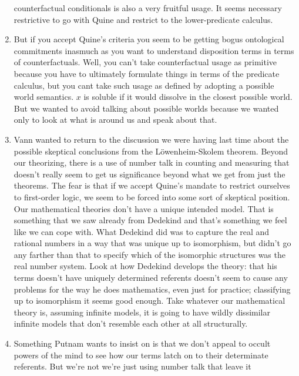 \documentclass[12pt]{article}
\theoremstyle{definition}
\begin{document}
\begin{enumerate}
        counterfactual conditionals is also a very fruitful usage. It seems
        necessary restrictive to go with Quine and restrict to the
        lower-predicate calculus.
    \item
        But if you accept Quine's criteria you seem to be getting bogus
        ontological commitments inasmuch as you want to understand disposition
        terms in terms of counterfactuals. Well, you can't take counterfactual
        usage as primitive because you have to ultimately formulate things in
        terms of the predicate calculus, but you cant take such usage as
        defined by adopting a possible world semantics. $x$ is soluble if it
        would dissolve in the closest possible world. But we wanted to avoid
        talking about possible worlds because we wanted only to look at what is
        around us and speak about that.
    \item
        Vann wanted to return to the discussion we were having last time about
        the possible skeptical conclusions from the L\"owenheim-Skolem theorem.
        Beyond our theorizing, there is a use of number talk in counting and
        measuring that doesn't really seem to get us significance beyond what
        we get from just the theorems. The fear is that if we accept Quine's
        mandate to restrict ourselves to first-order logic, we seem to be
        forced into some sort of skeptical position. Our mathematical theories
        don't have a unique intended model. That is something that we saw
        already from Dedekind and that's something we feel like we can cope
        with. What Dedekind did was to capture the real and rational numbers in
        a way that was unique up to isomorphism, but didn't go any farther than
        that to specify which of the isomorphic structures was the real number
        system. Look at how Dedekind develops the theory: that his terms
        doesn't have uniquely determined referents doesn't seem to cause any
        problems for the way he does mathematics, even just for practice;
        classifying up to isomorphism it seems good enough. Take whatever our
        mathematical theory is, assuming infinite models, it is going to have
        wildly dissimilar infinite models that don't resemble each other at all
        structurally.
    \item
        Something Putnam wants to insist on is that we don't appeal to occult
        powers of the mind to see how our terms latch on to their determinate
        referents. But we're not we're just using number talk that leave it

\end{enumerate}
\end{document}
